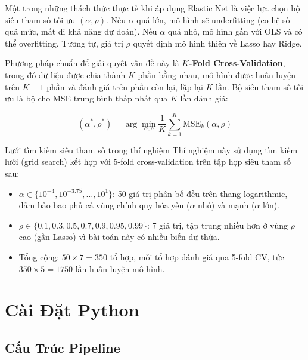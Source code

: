 \documentclass[12pt,a4paper]{article}
\begin{document}
Một trong những thách thức thực tế khi áp dụng Elastic Net là việc lựa chọn bộ siêu tham số tối ưu $(\alpha, \rho)$. Nếu $\alpha$ quá lớn, mô hình sẽ underfitting (co hệ số quá mức, mất đi khả năng dự đoán). Nếu $\alpha$ quá nhỏ, mô hình gần với OLS và có thể overfitting. Tương tự, giá trị $\rho$ quyết định mô hình thiên về Lasso hay Ridge.

Phương pháp chuẩn để giải quyết vấn đề này là \textbf{$K$-Fold Cross-Validation}, trong đó dữ liệu được chia thành $K$ phần bằng nhau, mô hình được huấn luyện trên $K-1$ phần và đánh giá trên phần còn lại, lặp lại $K$ lần. Bộ siêu tham số tối ưu là bộ cho MSE trung bình thấp nhất qua $K$ lần đánh giá:

\begin{equation}
(\alpha^*, \rho^*) = \arg\min_{\alpha, \rho} \frac{1}{K}\sum_{k=1}^{K} \text{MSE}_k(\alpha, \rho)
\end{equation}

\begin{definitionbox}{Lưới tìm kiếm siêu tham số trong thí nghiệm}
Thí nghiệm này sử dụng tìm kiếm lưới (grid search) kết hợp với 5-fold cross-validation trên tập hợp siêu tham số sau:
\begin{itemize}[leftmargin=1.5em]
    \item $\alpha \in \{10^{-4}, 10^{-3.75}, \ldots, 10^{1}\}$: 50 giá trị phân bố đều trên thang logarithmic, đảm bảo bao phủ cả vùng chính quy hóa yếu ($\alpha$ nhỏ) và mạnh ($\alpha$ lớn).
    \item $\rho \in \{0.1, 0.3, 0.5, 0.7, 0.9, 0.95, 0.99\}$: 7 giá trị, tập trung nhiều hơn ở vùng $\rho$ cao (gần Lasso) vì bài toán này có nhiều biến dư thừa.
    \item Tổng cộng: $50 \times 7 = 350$ tổ hợp, mỗi tổ hợp đánh giá qua 5-fold CV, tức $350 \times 5 = 1750$ lần huấn luyện mô hình.
\end{itemize}
\end{definitionbox}

\section{Cài Đặt Python}

\subsection{Cấu Trúc Pipeline}
\end{document}
